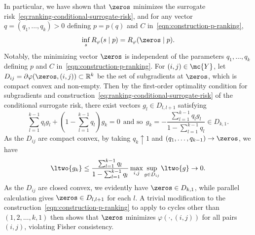 \documentclass[11pt]{article}
\newcommand{\prn}[1]{\left({#1}\right)} %
\newcommand{\sloss}{\varphi}  %
\begin{document}
In particular, we have shown that $\zeros$ minimizes the
surrogate risk~\eqref{eq:ranking-conditional-surrogate-risk},
and for any vector $q = (q_1, \ldots, q_k) > 0$ defining
$p = p(q)$ and $C$ in~\eqref{eqn:construction-p-ranking},
\begin{equation*}
  \inf_s R_\sloss(s \mid p) = R_\sloss(\zeros \mid p).
\end{equation*}
Notably, the minimizing vector $\zeros$ is independent of the parameters
$q_1, \ldots, q_k$ defining $p$ and $C$
in~\eqref{eqn:construction-p-ranking}.
%
For $(i, j) \in \mc{Y}$, let $D_{ij}
= \partial \varphi(\zeros, (i,j)) \subset \mathbb{R}^k$ be the set of
subgradients at $\zeros$, which is compact convex and non-empty.
%
Then by the
first-order optimality condition for subgradients and
construction~\eqref{eq:ranking-conditional-surrogate-risk} of the
conditional surrogate risk, there exist vectors $g_l \in D_{l,l+1}$
satisfying
\begin{equation*}
  \sum_{l=1}^{k-1} q_l g_l + \prn{1 - \sum_{l=1}^{k-1} q_l} g_k = 0
  ~~ \mbox{and~so}~~
  g_k = -\frac{\sum_{l=1}^{k-1} q_l g_l}{1 - \sum_{l=1}^{k-1} q_l} \in D_{k,1}.
\end{equation*}
As the $D_{ij}$ are compact convex, by taking
$q_k \uparrow 1$ and $(q_1, \ldots, q_{k-1}) \to \zeros$, we have
\begin{equation*}
  \ltwo{g_k} \leq
  \frac{\sum_{l=1}^{k-1} q_l}{1 - \sum_{l=1}^{k-1} q_l}
  \max_{i,j} \sup_{g \in D_{ij}} \ltwo{g} \to 0.
\end{equation*}
As the $D_{ij}$ are closed convex, we evidently have $\zeros \in D_{k,1}$,
while parallel calculation gives $\zeros \in D_{l,l+1}$ for each $l$.
%
A trivial modification to the construction~\eqref{eqn:construction-p-ranking}
to apply to cycles other than $(1, 2, \ldots, k, 1)$ then shows that
$\zeros$ minimizes $\varphi(\cdot, (i, j))$ for all pairs
$(i, j)$, violating Fisher consistency.

\end{document}
